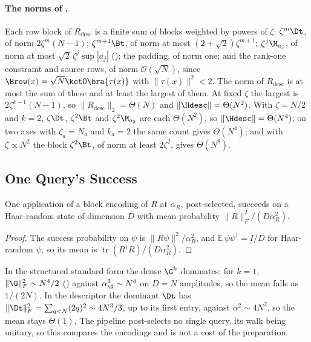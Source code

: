 \paragraph{The norms of .} Each row block of $R_{\mathrm{desc}}$ is a finite sum of blocks weighted by powers of $\zeta$: $\zeta^m\Dt$, of norm $2\zeta^m(N-1)$; $\zeta^{m+1}\Bt$, of norm at most $(2+\sqrt2)\zeta^{m+1}$; $\zeta^j\M_{a_j}$, of norm at most $\sqrt2\,\zeta^j\sup|a_j|$ (); the padding, of norm one; and the rank-one constraint and source rows, of norm $\mathcal{O}(\sqrt N)$, since $\Brow(x)=\sqrt N\ket0\bra{\tau(x)}$ with $\|\tau(x)\|^2<2$. The norm of $R_{\mathrm{desc}}$ is at most the sum of these and at least the largest of them. At fixed $\zeta$ the largest is $2\zeta^{k-1}(N-1)$, so $\|R_{\mathrm{desc}}\|_2=\Theta(N)$ and $\|\Hdesc\|=\Theta(N^2)$. With $\zeta=N/2$ and $k=2$, $\zeta\Dt$, $\zeta^2\Bt$ and $\zeta^2\M_{a_2}$ are each $\Theta(N^2)$, so $\|\Hdesc\|=\Theta(N^4)$; on two axes with $\zeta_a=N_a$ and $k_a=2$ the same count gives $\Theta(N^4)$; and with $\zeta\propto N^2$ the block $\zeta^2\Bt$, of norm at least $2\zeta^2$, gives $\Theta(N^8)$.

\subsection{One Query's Success}
\label{app:haar-success}

\begin{proposition}
\label{prop:haar-success}
One application of a block encoding of $R$ at $\alpha_R$, post-selected, succeeds on a Haar-random state of dimension $D$ with mean probability $\|R\|_F^2/(D\alpha_R^2)$.
\end{proposition}
\begin{proof}
The success probability on $\psi$ is $\|R\psi\|^2/\alpha_R^2$, and $\mathbb{E}\,\psi\psi^\dagger=I/D$ for Haar-random $\psi$, so its mean is $\operatorname{tr}(R^\dagger R)/(D\alpha_R^2)$.
\end{proof}

In the structured standard form the dense $\G^k$ dominates: for $k=1$, $\|\G\|_F^2\sim N^4/2$ () against $\alpha_\G^2\sim N^4$ on $D=N$ amplitudes, so the mean falls as $1/(2N)$. In the descriptor the dominant $\Dt$ has $\|\Dt\|_F^2=\sum_{q<N}(2q)^2\sim4N^3/3$, up to its first entry, against $\alpha^2\sim4N^2$, so the mean stays $\Theta(1)$. The pipeline post-selects no single query, its walk being unitary, so this compares the encodings and is not a cost of the preparation.
